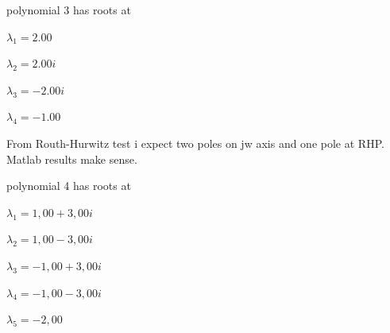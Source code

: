 \documentclass[11pt]{article}
\begin{document}
polynomial 3 has roots at

$\lambda_1=2.00$

$\lambda_2=2.00i$

$\lambda_3=-2.00i$

$\lambda_4=-1.00$

From Routh-Hurwitz test i expect two poles on jw axis and one pole at RHP. Matlab results make sense.
\vspace{5mm}

polynomial 4 has roots at

$\lambda_1=1,00 + 3,00i$

$\lambda_2=1,00 - 3,00i$

$\lambda_3=-1,00 + 3,00i$

$\lambda_4=-1,00 - 3,00i$

$\lambda_5=-2,00$
\end{document}

